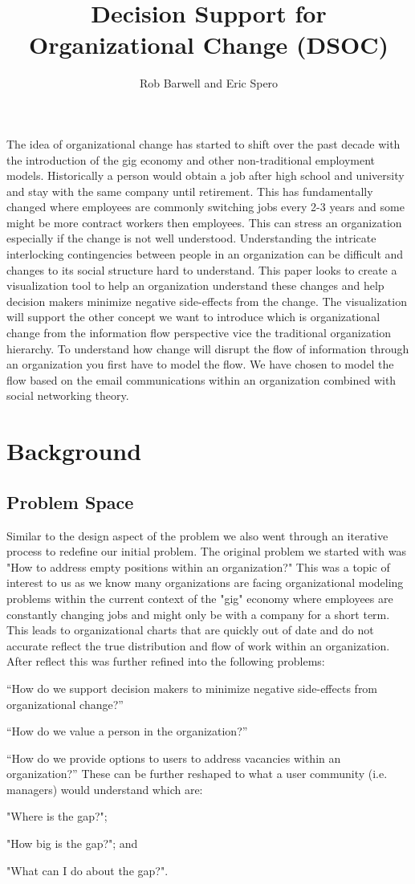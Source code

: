 \documentclass[journal]{vgtc}                %
\title{Decision Support for Organizational Change (DSOC)}
\author{Rob Barwell and Eric Spero}
\begin{document}

\maketitle
The idea of organizational change has started to shift over the past decade with the introduction of the gig economy and other non-traditional employment models.  Historically a person would obtain a job after high school and university and stay with the same company until retirement.  This has fundamentally changed where employees are commonly switching jobs every 2-3 years and some might be more contract workers then employees.  This can stress an organization especially if the change is not well understood.  Understanding the intricate interlocking contingencies between people in an organization can be difficult and changes to its social structure hard to understand.  This paper looks to create a visualization tool to help an organization understand these changes and help decision makers minimize negative side-effects from the change.
The visualization will support the other concept we want to introduce which is organizational change from the information flow perspective vice the traditional organization hierarchy.  To understand how change will disrupt the flow of information through an organization you first have to model the flow.  We have chosen to model the flow based on the email communications within an organization combined with social networking theory.

\section{Background}

\subsection{Problem Space}
Similar to the design aspect of the problem we also went through an iterative process to redefine our initial problem.  The original problem we started with was "How to address empty positions within an organization?"  This was a topic of interest to us as we know many organizations are facing organizational modeling problems within the current context of the "gig" economy where employees are constantly changing jobs and might only be with a company for a short term.  This leads to organizational charts that are quickly out of date and do not accurate reflect the true distribution and flow of work within an organization.  
After reflect this was further refined into the following problems:
\item “How do we support decision makers to minimize negative side-effects from organizational change?”
\item “How do we value a person in the organization?”
\item “How do we provide options to users to address vacancies within an organization?”
These can be further reshaped to what a user community (i.e. managers) would understand which are:
\item "Where is the gap?";
\item "How big is the gap?"; and
\item "What can I do about the gap?".
\end{document}
